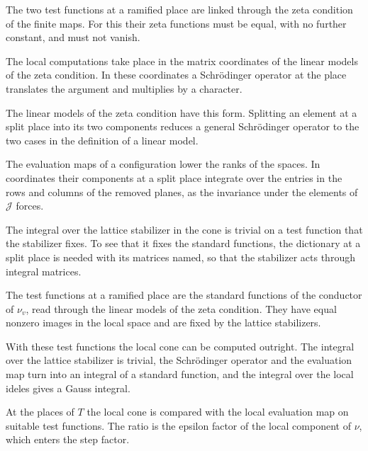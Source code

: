 The two test functions at a ramified place are linked through the zeta
condition of the finite maps. For this their zeta functions must be equal, with
no further constant, and must not vanish.

The local computations take place in the matrix coordinates of the linear models
of the zeta condition. In these coordinates a Schrödinger operator at the place
translates the argument and multiplies by a character.

The linear models of the zeta condition have this form. Splitting an element at
a split place into its two components reduces a general Schrödinger operator to
the two cases in the definition of a linear model.

The evaluation maps of a configuration lower the ranks of the spaces. In
coordinates their components at a split place integrate over the entries in the
rows and columns of the removed planes, as the invariance under the elements of
$\mathcal J$ forces.

The integral over the lattice stabilizer in the cone is trivial on a test
function that the stabilizer fixes. To see that it fixes the standard functions,
the dictionary at a split place is needed with its matrices named, so that the
stabilizer acts through integral matrices.

The test functions at a ramified place are the standard functions of the
conductor of $\nu_v$, read through the linear models of the zeta condition.
They have equal nonzero images in the local space and are fixed by the lattice
stabilizers.

With these test functions the local cone can be computed outright. The integral
over the lattice stabilizer is trivial, the Schrödinger operator and the
evaluation map turn into an integral of a standard function, and the integral
over the local ideles gives a Gauss integral.

At the places of $T$ the local cone is compared with the local evaluation
map on suitable test functions. The ratio is the epsilon factor of the local
component of $\nu$, which enters the step factor.

